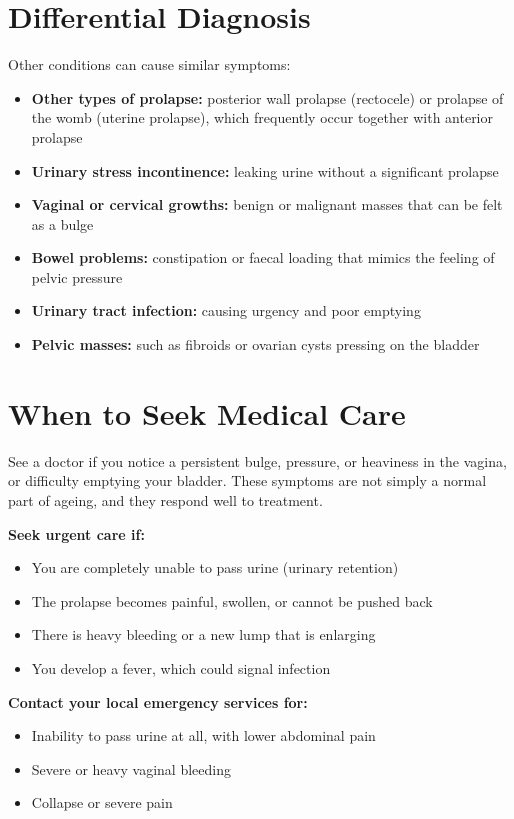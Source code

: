 \section*{Differential Diagnosis}
Other conditions can cause similar symptoms:

\begin{itemize}
    \item \textbf{Other types of prolapse:} posterior wall prolapse (rectocele) or prolapse of the womb (uterine prolapse), which frequently occur together with anterior prolapse
    \item \textbf{Urinary stress incontinence:} leaking urine without a significant prolapse
    \item \textbf{Vaginal or cervical growths:} benign or malignant masses that can be felt as a bulge
    \item \textbf{Bowel problems:} constipation or faecal loading that mimics the feeling of pelvic pressure
    \item \textbf{Urinary tract infection:} causing urgency and poor emptying
    \item \textbf{Pelvic masses:} such as fibroids or ovarian cysts pressing on the bladder
\end{itemize}

\section*{When to Seek Medical Care}
See a doctor if you notice a persistent bulge, pressure, or heaviness in the vagina, or difficulty emptying your bladder. These symptoms are not simply a normal part of ageing, and they respond well to treatment.

\textbf{Seek urgent care if:}
\begin{itemize}
    \item You are completely unable to pass urine (urinary retention)
    \item The prolapse becomes painful, swollen, or cannot be pushed back
    \item There is heavy bleeding or a new lump that is enlarging
    \item You develop a fever, which could signal infection
\end{itemize}

\textbf{Contact your local emergency services for:}
\begin{itemize}
    \item Inability to pass urine at all, with lower abdominal pain
    \item Severe or heavy vaginal bleeding
    \item Collapse or severe pain
\end{itemize}

